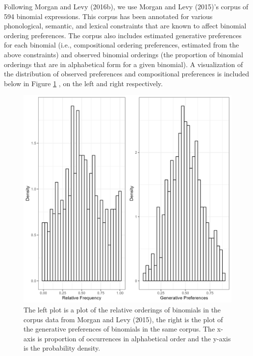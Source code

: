 \documentclass[
  jou,floatsintext]{apa6}
\begin{document}
Following Morgan and Levy (2016b), we use Morgan and Levy (2015)'s corpus of 594 binomial expressions. This corpus has been annotated for various phonological, semantic, and lexical constraints that are known to affect binomial ordering preferences. The corpus also includes estimated generative preferences for each binomial (i.e., compositional ordering preferences, estimated from the above constraints) and observed binomial orderings (the proportion of binomial orderings that are in alphabetical form for a given binomial). A visualization of the distribution of observed preferences and compositional preferences is included below in Figure \ref{fig:corpusplot1} , on the left and right respectively.



\begin{figure}

{\centering \includegraphics[width=1\linewidth]{Figures/corpus_plots} 

}

\caption{The left plot is a plot of the relative orderings of binomials in the corpus data from Morgan and Levy (2015), the right is the plot of the generative preferences of binomials in the same corpus. The x-axis is proportion of occurrences in alphabetical order and the y-axis is the probability density.}\label{fig:corpusplot1}
\end{figure}
\end{document}
